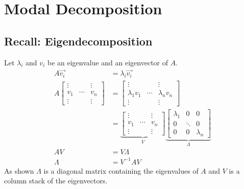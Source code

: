 \section{Modal Decomposition}

\subsection{Recall: Eigendecomposition}
Let $\lambda_i$ and $v_i$ be an eigenvalue and an eigenvector of $A$.
\begin{align*}
    A \vec{v_i} & = \lambda_i \vec{v_i}                       \\
    A \begin{bmatrix}
          \vdots &        & \vdots  \\
          v_1    & \cdots & v_n     \\
          \vdots &        & \vdots
      \end{bmatrix}
                & = \begin{bmatrix}
                        \vdots        &        & \vdots        \\
                        \lambda_1 v_1 & \cdots & \lambda_n v_n \\
                        \vdots        &        & \vdots
                    \end{bmatrix} \\
                & = \underbrace{\begin{bmatrix}
                                        \vdots &        & \vdots  \\
                                        v_1    & \cdots & v_n     \\
                                        \vdots &        & \vdots
                                    \end{bmatrix}}_{V}
    \underbrace{\begin{bmatrix}
                        \lambda_1 & 0      & 0          \\
                        0         & \ddots & 0          \\
                        0         & 0      & \lambda_n
                    \end{bmatrix}}_{\Lambda}            \\
    AV          & = V\Lambda                                  \\
    \Lambda     & = V^{-1}AV
\end{align*}
As shown $\Lambda$ is a diagonal matrix containing the eigenvalues of $A$ and $V$ is a column stack of the eigenvectors.

